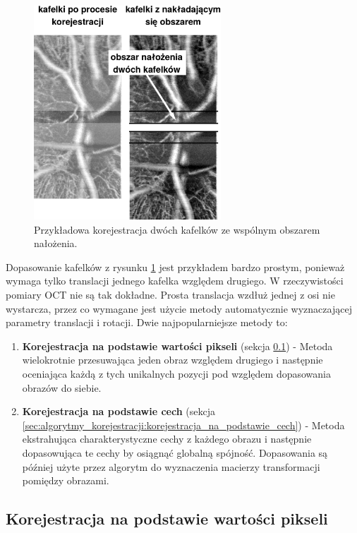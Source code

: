 \begin{figure}[H]
  \centering
  \includegraphics[width=7cm]{gfx/align}
  \caption{Przykładowa korejestracja dwóch kafelków ze wspólnym obszarem nałożenia.}
  \label{fig:algorytmy_korejestracji:align}
\end{figure}

Dopasowanie kafelków z rysunku \ref{fig:algorytmy_korejestracji:align} jest przykładem bardzo prostym, ponieważ wymaga tylko translacji jednego kafelka względem drugiego. W rzeczywistości pomiary OCT nie są tak dokładne. Prosta translacja wzdłuż jednej z osi nie wystarcza, przez co wymagane jest użycie metody automatycznie wyznaczającej parametry translacji i rotacji. Dwie najpopularniejsze metody to:

\begin{enumerate}
\item \textbf{Korejestracja na podstawie wartości pikseli} (sekcja \ref{sec:algorytmy_korejestracji:korejestracja_na_podstawie_wartosci}) - Metoda wielokrotnie przesuwająca jeden obraz względem drugiego i następnie oceniająca każdą z tych unikalnych pozycji pod względem dopasowania obrazów do siebie.
\item \textbf{Korejestracja na podstawie cech} (sekcja \ref{sec:algorytmy_korejestracji:korejestracja_na_podstawie_cech}) - Metoda ekstrahująca charakterystyczne cechy z każdego obrazu i następnie dopasowująca te cechy by osiągnąć globalną spójność. Dopasowania są później użyte przez algorytm do wyznaczenia macierzy transformacji pomiędzy obrazami.
\end{enumerate}

\subsection{Korejestracja na podstawie wartości pikseli}
\label{sec:algorytmy_korejestracji:korejestracja_na_podstawie_wartosci}

